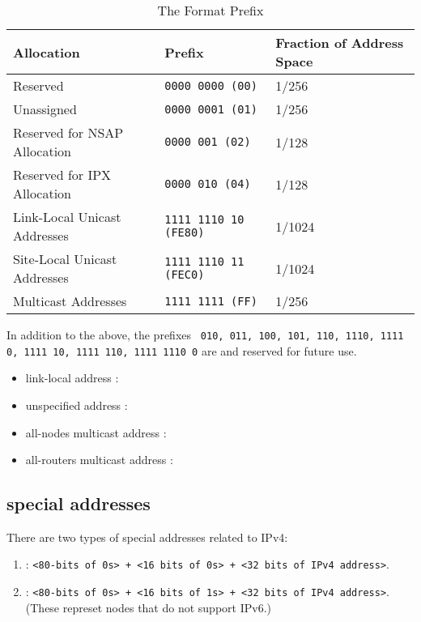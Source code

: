 \begin{table}[h]
  \centering
  \begin{tabularx}{1.0\linewidth}{XXX}
    Allocation& Prefix & Fraction of Address Space \\
    \hline
    Reserved & \texttt{0000 0000 (00)} & 1/256\\
    Unassigned & \texttt{0000 0001 (01)} & 1/256\\
    Reserved for NSAP Allocation & \texttt{0000 001 (02)} & 1/128\\
    Reserved for IPX Allocation & \texttt{0000 010 (04)} & 1/128\\
    Link-Local Unicast Addresses & \texttt{1111 1110 10 (FE80)} & 1/1024\\
    Site-Local Unicast Addresses & \texttt{1111 1110 11 (FEC0)} & 1/1024\\
    Multicast Addresses & \texttt{1111 1111 (FF)} & 1/256\\
  \end{tabularx}
  \caption{The Format Prefix}
  \label{tab:fp}
\end{table}

In addition to the above, the prefixes \texttt{
  010, 011, 100, 101, 110, 1110, 1111 0, 1111 10, 1111 110, 1111 1110 0} are
 and reserved for future use.


\clearpage{}

\begin{itemize}
\item link-local address : 
\item unspecified address : 
\item all-nodes multicast address : 
\item all-routers multicast address : 
\end{itemize}

\subsection{special addresses}

There are two types of special addresses related to IPv4:
\begin{enumerate}
\item {} : \texttt{<80-bits of 0s> + <16
    bits of 0s> + <32 bits of IPv4 address>}.
\item {} : \texttt{<80-bits of 0s> + <16 bits of
    1s> + <32 bits of IPv4 address>}. (These represet nodes that do not support IPv6.)
\end{enumerate}

